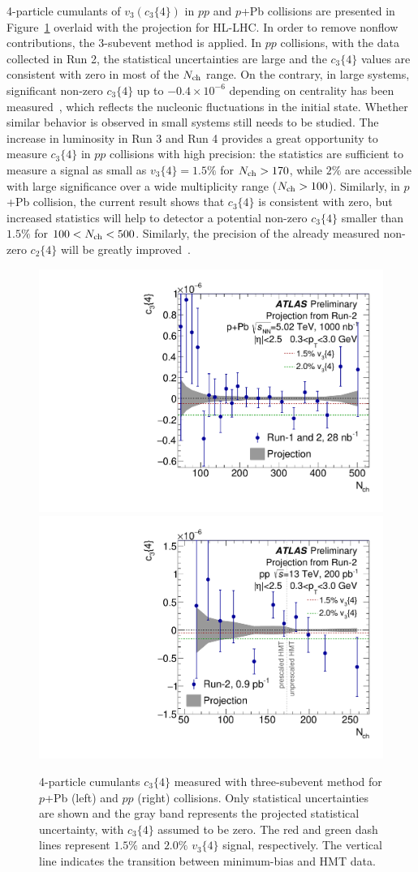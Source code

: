 4-particle cumulants of $v_3 (c_3\{4\})$ in $pp$ and $p$+Pb collisions are presented in Figure~\ref{fig:subcumu_ATLAS_c34_proj1} overlaid with the projection for HL-LHC. In order to remove nonflow contributions, the 3-subevent method is applied. In $pp$ collisions, with the data collected in Run 2, the statistical uncertainties are large and the $c_3\{4\}$ values are consistent with zero in most of the $N_\text{ch}$ range. On the contrary, in large systems, significant non-zero $c_3\{4\}$ up to $-0.4\times 10^{-6}$ depending on centrality has been measured~\cite{Aad:2014vba}, which reflects the nucleonic fluctuations in the initial state. Whether similar behavior is observed in small systems still needs to be studied. The increase in luminosity in Run 3 and Run 4 provides a great opportunity to measure $c_3\{4\}$ in $pp$ collisions with high precision: the statistics are sufficient to measure a signal as small as $v_3\{4\}=1.5\%$ for $N_\text{ch}>170$, while $2\%$ are accessible with large significance over a wide multiplicity range ($N_\text{ch}>100$). Similarly, in $p$+Pb collision, the current result shows that $c_3\{4\}$ is consistent with zero, but increased statistics will help to detector a potential non-zero $c_3\{4\}$ smaller than $1.5\%$ for $100<N_\text{ch}<500$. Similarly, the precision of the already measured non-zero $c_2\{4\}$ will be greatly improved~\cite{ATL-PHYS-PUB-2018-020}.

\begin{figure}[H]
\centering
\includegraphics[width=.475\linewidth]{figs/chapter_subcumu/ATLAS_c34_pPb_proj.pdf}
\includegraphics[width=.475\linewidth]{figs/chapter_subcumu/ATLAS_c34_pp_proj1.pdf}
\caption{4-particle cumulants $c_3\{4\}$ measured with three-subevent method for $p$+Pb (left) and $pp$ (right) collisions. Only statistical uncertainties are shown and the gray band represents the projected statistical uncertainty, with $c_3\{4\}$ assumed to be zero. The red and green dash lines represent $1.5\%$ and $2.0\%$ $v_3\{4\}$ signal, respectively. The vertical line indicates the transition between minimum-bias and HMT data.}
\label{fig:subcumu_ATLAS_c34_proj1}
\end{figure}

